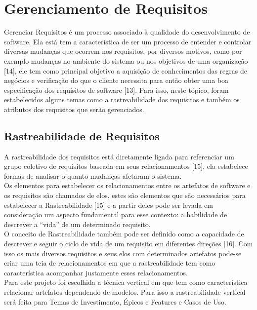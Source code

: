 
\chapter[Gerenciamento de Requisitos]{Gerenciamento de Requisitos}


Gerenciar Requisitos é um processo associado à qualidade do desenvolvimento de software. Ela está tem a característica de ser um processo de entender e controlar diversas mudanças que ocorrem nos requisitos, por diversos motivos, como por exemplo mudanças no ambiente do sistema ou nos objetivos de uma organização [14], ele tem como principal objetivo a aquisição de conhecimentos das regras de negócios e verificação do que o cliente necessita para então obter uma boa especificação dos requisitos de software [13]. Para isso, neste tópico, foram estabelecidos alguns temas como a rastreabilidade dos requisitos e também os atributos dos requisitos que serão gerenciados.\\

\section{Rastreabilidade de Requisitos}
A rastreabilidade dos requisitos está diretamente ligada para referenciar um grupo coletivo de requisitos baseada em seus relacionamentos [15], ela estabelece formas de analisar o quanto mudanças afetaram o sistema.\\
\tab Os elementos para estabelecer os relacionamentos entre os artefatos de software e os requisitos são chamados de elos, estes são elementos que são necessários para estabelecer a Rastreabilidade [15] e a partir deles pode ser levada em consideração um aspecto fundamental para esse contexto: a habilidade de descrever a “vida” de um determinado requisito.\\
\tab O conceito de Rastreabilidade também pode ser definido como a capacidade de descrever e seguir o ciclo de vida de um requisito em diferentes direções [16]. Com isso os mais diversos requisitos e seus elos com determinados artefatos pode-se criar uma teia de relacionamentos em que a rastreabilidade tem como característica acompanhar justamente esses relacionamentos.\\
\tab Para este projeto foi escolhida a técnica vertical em que tem como característica relacionar artefatos dependendo de modelos. Para isso a rastreabilidade vertical será feita para Temas de Investimento, Épicos e Features e Casos de Uso.\\

